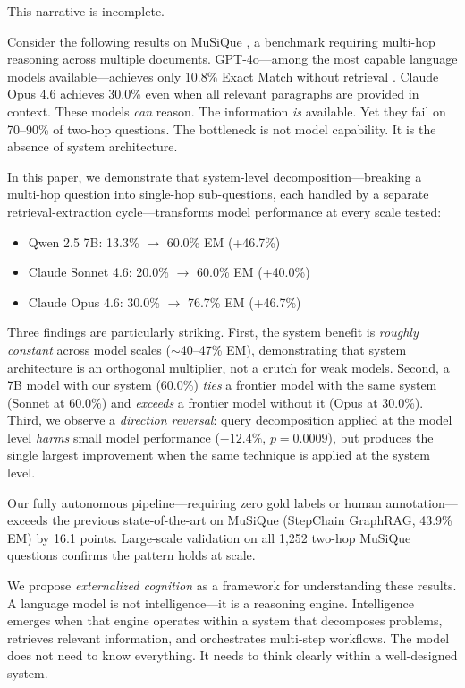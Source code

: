 \documentclass[11pt]{article}
\begin{document}
This narrative is incomplete.

Consider the following results on MuSiQue \citep{trivedi2022musique}, a benchmark requiring multi-hop reasoning across multiple documents. GPT-4o---among the most capable language models available---achieves only 10.8\% Exact Match without retrieval \citep{wang2025stepchain}. Claude Opus 4.6 achieves 30.0\% even when all relevant paragraphs are provided in context. These models \emph{can} reason. The information \emph{is} available. Yet they fail on 70--90\% of two-hop questions. The bottleneck is not model capability. It is the absence of system architecture.

In this paper, we demonstrate that system-level decomposition---breaking a multi-hop question into single-hop sub-questions, each handled by a separate retrieval-extraction cycle---transforms model performance at every scale tested:

\begin{itemize}[nosep]
    \item Qwen 2.5 7B: 13.3\% $\rightarrow$ 60.0\% EM (+46.7\%)
    \item Claude Sonnet 4.6: 20.0\% $\rightarrow$ 60.0\% EM (+40.0\%)
    \item Claude Opus 4.6: 30.0\% $\rightarrow$ 76.7\% EM (+46.7\%)
\end{itemize}

Three findings are particularly striking. First, the system benefit is \emph{roughly constant} across model scales ($\sim$40--47\% EM), demonstrating that system architecture is an orthogonal multiplier, not a crutch for weak models. Second, a 7B model with our system (60.0\%) \emph{ties} a frontier model with the same system (Sonnet at 60.0\%) and \emph{exceeds} a frontier model without it (Opus at 30.0\%). Third, we observe a \emph{direction reversal}: query decomposition applied at the model level \emph{harms} small model performance ($-12.4\%$, $p=0.0009$), but produces the single largest improvement when the same technique is applied at the system level.

Our fully autonomous pipeline---requiring zero gold labels or human annotation---exceeds the previous state-of-the-art on MuSiQue (StepChain GraphRAG, 43.9\% EM) by 16.1 points. Large-scale validation on all 1,252 two-hop MuSiQue questions confirms the pattern holds at scale.

We propose \emph{externalized cognition} as a framework for understanding these results. A language model is not intelligence---it is a reasoning engine. Intelligence emerges when that engine operates within a system that decomposes problems, retrieves relevant information, and orchestrates multi-step workflows. The model does not need to know everything. It needs to think clearly within a well-designed system.
\end{document}
